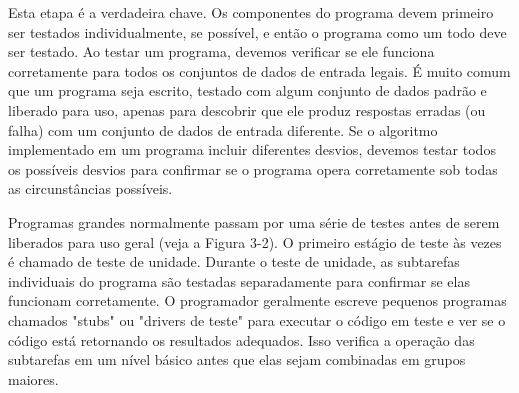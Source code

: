 \documentclass[11pt,a4paper]{book}
\begin{document}
	Esta etapa é a verdadeira chave. Os componentes do programa devem primeiro ser testados individualmente, se possível, e então o programa como um todo deve ser testado. Ao testar um programa, devemos verificar se ele funciona corretamente para todos os conjuntos de dados de entrada legais. É muito comum que um programa seja escrito, testado com algum conjunto de dados padrão e liberado para uso, apenas para descobrir que ele produz respostas erradas (ou falha) com um conjunto de dados de entrada diferente. Se o algoritmo implementado em um programa incluir diferentes desvios, devemos testar todos os possíveis desvios para confirmar se o programa opera corretamente sob todas as circunstâncias possíveis.
	
	Programas grandes normalmente passam por uma série de testes antes de serem liberados para uso geral (veja a Figura 3-2). O primeiro estágio de teste às vezes é chamado de teste de unidade. Durante o teste de unidade, as subtarefas individuais do programa são testadas separadamente para confirmar se elas funcionam corretamente. O programador geralmente escreve pequenos programas chamados "stubs" ou "drivers de teste" para executar o código em teste e ver se o código está retornando os resultados adequados. Isso verifica a operação das subtarefas em um nível básico antes que elas sejam combinadas em grupos maiores.
	
	
	
	
\end{document}
